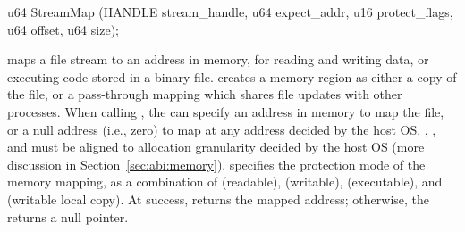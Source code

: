  








                   
\begin{paldef}            
u64 StreamMap (HANDLE stream_handle, u64 expect_addr,
               u16 protect_flags, u64 offset, u64 size);
\end{paldef}


 maps a file stream to an address in memory, for reading and writing data, or executing code stored in a binary file.
 creates a memory region
as either a copy of the file,
or a pass-through mapping which shares file updates with other processes.
When calling ,
the \libos{} can specify an address in memory to map the file, or a null address (i.e., zero) to map at any address decided by the host OS.
, , and  must be aligned
to allocation granularity decided by the host OS (more discussion in Section~\ref{sec:abi:memory}).
 specifies the protection mode
of the memory mapping, as a combination of  (readable),  (writable),  (executable), and  (writable local copy).
At success,  returns the mapped address; otherwise, the \hostapi{} returns a null pointer.




